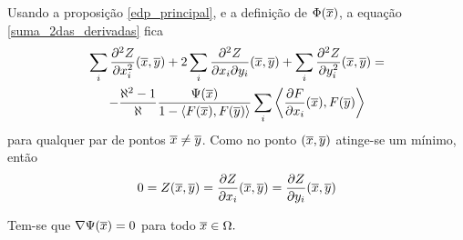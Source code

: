 Usando a proposição \ref{edp_principal}, e a definição de $\Phi(\overline{x})$, a equação \eqref{suma_2das_derivadas} fica
\begin{multline}\label{suma_2da_der_aleph}
\sum_i \frac{\partial^2 Z}{\partial x_i^2}(\overline{x},\overline{y}) + 2 \sum_i \frac{\partial^2 Z}{\partial x_i \partial y_i}(\overline{x},\overline{y}) + \sum_i \frac{\partial^2 Z}{\partial y_i^2}(\overline{x},\overline{y}) =\\
- \frac{\aleph^2 - 1}{\aleph} \frac{\Psi(\overline{x})}{1 - \langle F(\overline{x}), F(\overline{y}) \rangle} \sum_i \left\langle \frac{\partial F}{\partial x_i}(\overline{x}), F(\overline{y}) \right\rangle
\end{multline}
para qualquer par de pontos $\overline{x} \neq \overline{y}$. Como no ponto $(\overline{x},\overline{y})$ atinge-se um mínimo, então
\begin{equation*}
	0 = Z(\overline{x},\overline{y}) = \frac{\partial Z}{\partial x_i}(\overline{x},\overline{y}) = \frac{\partial Z}{\partial y_i}(\overline{x},\overline{y})
\end{equation*}

\begin{proposicao}
	Tem-se que $\nabla \Psi(\overline{x}) = 0$ para todo $\overline{x} \in \Omega.$
\end{proposicao}

